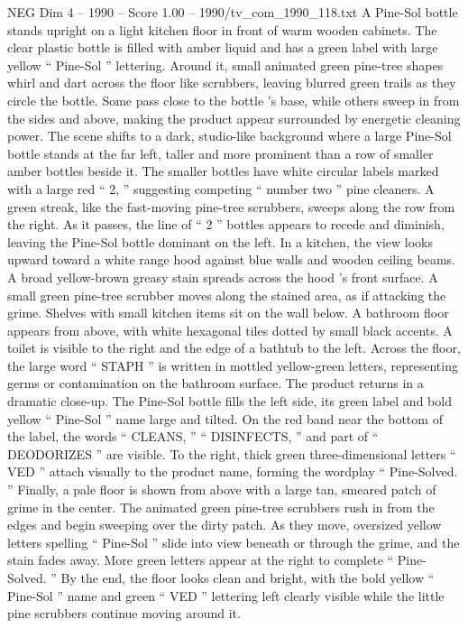 \begin{textsample}{NEG Dim 4 – 1990 – Score 1.00 – 1990/tv\_com\_1990\_118.txt}  \label{ex:f4_neg_029}
A Pine-Sol bottle stands upright on a light kitchen floor in front of warm wooden cabinets.
The clear plastic bottle is filled with amber liquid and has a green label with large yellow “ Pine-Sol ” lettering.
Around it, small animated green pine-tree shapes whirl and dart across the floor like scrubbers, leaving blurred green trails as they circle the bottle.
Some pass close to the bottle ’s base, while others sweep in from the sides and above, making the product appear surrounded by energetic cleaning power.
The scene shifts to a dark, studio-like background where a large Pine-Sol bottle stands at the far left, taller and more prominent than a row of smaller amber bottles beside it.
The smaller bottles have white circular labels marked with a large red “ 2, ” suggesting competing “ number two ” pine cleaners.
A green streak, like the fast-moving pine-tree scrubbers, sweeps along the row from the right.
As it passes, the line of “ 2 ” bottles appears to recede and diminish, leaving the Pine-Sol bottle dominant on the left.
In a kitchen, the view looks upward toward a white range hood against blue walls and wooden ceiling beams.
A broad yellow-brown greasy stain spreads across the hood ’s front surface.
A small green pine-tree scrubber moves along the stained area, as if attacking the grime.
Shelves with small kitchen items sit on the wall below.
A bathroom floor appears from above, with white hexagonal tiles dotted by small black accents.
A toilet is visible to the right and the edge of a bathtub to the left.
Across the floor, the large word “ STAPH ” is written in mottled yellow-green letters, representing germs or contamination on the bathroom surface.
The product returns in a dramatic close-up.
The Pine-Sol bottle fills the left side, its green label and bold yellow “ Pine-Sol ” name large and tilted.
On the red band near the bottom of the label, the words “ CLEANS, ” “ DISINFECTS, ” and part of “ DEODORIZES ” are visible.
To the right, thick green three-dimensional letters “ VED ” attach visually to the product name, forming the wordplay “ Pine-Solved. ” Finally, a pale floor is shown from above with a large tan, smeared patch of grime in the center.
The animated green pine-tree scrubbers rush in from the edges and begin sweeping over the dirty patch.
As they move, oversized yellow letters spelling “ Pine-Sol ” slide into view beneath or through the grime, and the stain fades away.
More green letters appear at the right to complete “ Pine-Solved. ” By the end, the floor looks clean and bright, with the bold yellow “ Pine-Sol ” name and green “ VED ” lettering left clearly visible while the little pine scrubbers continue moving around it.

\end{textsample}
